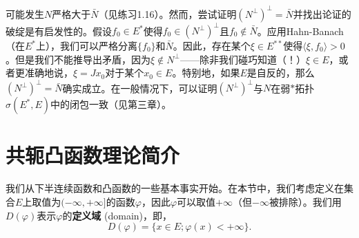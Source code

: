\begin{remark}
可能发生$N$严格大于$\bar{N}$（见练习1.16）。然而，尝试证明$(N^\perp)^\perp = \bar{N}$并找出论证的破绽是有启发性的。假设$f_0 \in E^*$使得$f_0 \in (N^\perp)^\perp$且$f_0 \notin \bar{N}$。应用Hahn-Banach（在$E^*$上），我们可以严格分离$\{f_0\}$和$\bar{N}$。因此，存在某个$\xi \in E^{**}$使得$\langle \xi, f_0 \rangle > 0$。但是我们不能推导出矛盾，因为$\xi \notin N^\perp$——除非我们碰巧知道（！）$\xi \in E$，或者更准确地说，$\xi=J x_0$对于某个$x_0 \in E$。特别地，如果$E$是自反的，那么$(N^\perp)^\perp = \bar{N}$确实成立。在一般情况下，可以证明$(N^\perp)^\perp$与$N$在弱$*$拓扑$\sigma(E^*, E)$中的闭包一致（见第三章）。
\end{remark}

\section{共轭凸函数理论简介}\label{sec:conjugate_convex}
我们从下半连续函数和凸函数的一些基本事实开始。在本节中，我们考虑定义在集合$E$上取值为$(-\infty, +\infty]$的函数$\varphi$，因此$\varphi$可以取值$+\infty$（但$-\infty$被排除）。我们用$D(\varphi)$表示$\varphi$的\textbf{定义域} (domain)，即，
\[ D(\varphi) = \{x \in E; \varphi(x) < +\infty\}. \]
